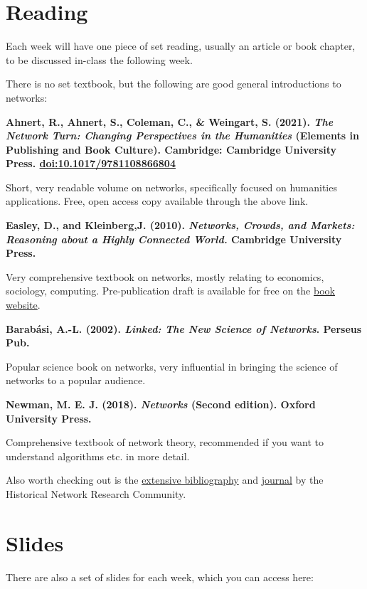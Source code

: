 \documentclass[
]{book}
\begin{document}
\hypertarget{reading}{%
\section{Reading}\label{reading}}

Each week will have one piece of set reading, usually an article or book
chapter, to be discussed in-class the following week.

There is no set textbook, but the following are good general
introductions to networks:

\textbf{Ahnert, R., Ahnert, S., Coleman, C., \& Weingart, S. (2021). \emph{The
Network Turn: Changing Perspectives in the Humanities} (Elements in
Publishing and Book Culture). Cambridge: Cambridge University Press.
\url{doi:10.1017/9781108866804}}

Short, very readable volume on networks, specifically focused on
humanities applications. Free, open access copy available through the
above link.

\textbf{Easley, D., and Kleinberg,J. (2010). \emph{Networks, Crowds, and Markets:
Reasoning about a Highly Connected World.} Cambridge University Press.}

Very comprehensive textbook on networks, mostly relating to economics,
sociology, computing. Pre-publication draft is available for free on the
\href{https://www.cs.cornell.edu/home/kleinber/networks-book/}{book website}.

\textbf{Barabási, A.-L. (2002). \emph{Linked: The New Science of Networks}. Perseus
Pub.}

Popular science book on networks, very influential in bringing the
science of networks to a popular audience.

\textbf{Newman, M. E. J. (2018). \emph{Networks} (Second edition). Oxford
University Press.}

Comprehensive textbook of network theory, recommended if you want to
understand algorithms etc. in more detail.

Also worth checking out is the \href{https://historicalnetworkresearch.org/bibliography/}{extensive
bibliography} and
\href{https://jhnr.uni.lu/index.php/jhnr}{journal} by the Historical Network
Research Community.

\hypertarget{slides}{%
\section{Slides}\label{slides}}

There are also a set of slides for each week, which you can access here:
\end{document}
